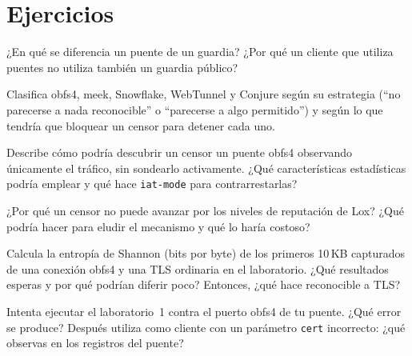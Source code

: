 \section*{Ejercicios}

\begin{esercizio}[1]\label{es:16-guard}
¿En qué se diferencia un puente de un guardia? ¿Por qué un cliente que utiliza puentes no utiliza también un guardia público?
\end{esercizio}

\begin{esercizio}[1]\label{es:16-strategie}
Clasifica obfs4, meek, Snowflake, WebTunnel y Conjure según su estrategia (\enquote{no parecerse a nada reconocible} o \enquote{parecerse a algo permitido}) y según lo que tendría que bloquear un censor para detener cada uno.
\end{esercizio}

\begin{esercizio}[2]\label{es:16-sondaggio}
Describe cómo podría descubrir un censor un puente obfs4 observando únicamente el tráfico, sin sondearlo activamente. ¿Qué características estadísticas podría emplear y qué hace \texttt{iat-mode} para contrarrestarlas?
\end{esercizio}

\begin{esercizio}[2]\label{es:16-lox}
¿Por qué un censor no puede avanzar por los niveles de reputación de Lox? ¿Qué podría hacer para eludir el mecanismo y qué lo haría costoso?
\end{esercizio}

\begin{esercizio}[2]\label{es:16-entropia}
Calcula la entropía de Shannon (bits por byte) de los primeros 10\,KB capturados de una conexión obfs4 y una TLS ordinaria en el laboratorio. ¿Qué resultados esperas y por qué podrían diferir poco? Entonces, ¿qué hace reconocible a TLS?
\end{esercizio}

\begin{esercizio}[3]\label{es:16-sondaggio-lab}
Intenta ejecutar el laboratorio~1 contra el puerto obfs4 de tu puente. ¿Qué error se produce? Después utiliza  como cliente con un parámetro \texttt{cert} incorrecto: ¿qué observas en los registros del puente?
\end{esercizio}

